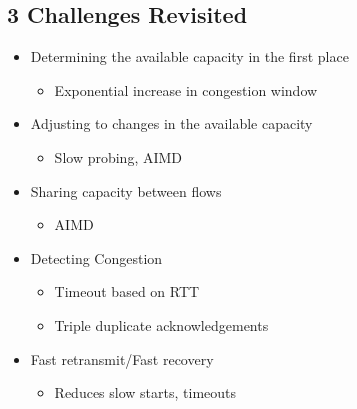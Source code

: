 \subsection{3 Challenges Revisited}
\begin{itemize}[nosep]
    \item Determining the available capacity in the first place
          \begin{itemize}[nosep]
              \item Exponential increase in congestion window
          \end{itemize}
    \item Adjusting to changes in the available capacity
          \begin{itemize}[nosep]
              \item Slow probing, AIMD
          \end{itemize}
    \item Sharing capacity between flows
          \begin{itemize}[nosep]
              \item AIMD
          \end{itemize}
    \item Detecting Congestion
          \begin{itemize}[nosep]
              \item Timeout based on RTT
              \item Triple duplicate acknowledgements
          \end{itemize}
    \item Fast retransmit/Fast recovery
          \begin{itemize}[nosep]
              \item Reduces slow starts, timeouts
          \end{itemize}
\end{itemize}